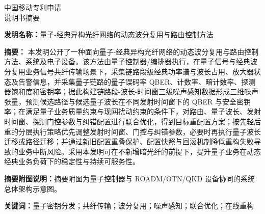 \documentclass[12pt,a4paper]{article}
\begin{document}
\begin{center}
    {\Large\heiti 中国移动专利申请} \\[0.5em]
    {\Huge\heiti 说明书摘要} \\[0.8em]
\end{center}

\noindent\textbf{发明名称：}量子-经典异构光纤网络的动态波分复用与路由控制方法

\vspace{0.8em}

\noindent\textbf{摘要：}
本发明公开了一种面向量子-经典异构光纤网络的动态波分复用与路由控制方法、系统及电子设备。该方法由量子控制器/编排器执行，在量子信号与经典波分复用业务信号共纤传输场景下，采集链路段级经典功率谱与波长占用、放大器状态及告警信息，并采集量子链路的量子误码率 QBER、计数率、暗计数率、探测器饱和度和密钥率；据此构建链路段-波长-时间窗三级噪声感知数据形成三维噪声张量，预测候选路径与候选量子波长在不同发射时间窗下的 QBER 与安全密钥率；在满足量子业务质量约束与现网扰动约束的条件下，对路由、量子波长、发射时间窗、探测门控参数与纠错配置进行联合优化，得到目标重配置方案；按先轻后重的分层执行策略优先调整发射时间窗、门控与纠错参数，必要时再执行量子波长迁移或路径迁移；并通过新旧配置重叠保护、配置快照与回滚机制降低重构失败导致的业务中断风险。采用本发明可在不新增暗光纤的前提下，提升量子业务在动态经典业务负荷下的稳定性与持续可服务性。

\vspace{0.6em}

\noindent\textbf{摘要附图说明：}摘要附图为量子控制器与 ROADM/OTN/QKD 设备协同的系统总体架构示意图。

\vspace{0.6em}

\noindent\textbf{关键词：}量子密钥分发；共纤传输；波分复用；噪声感知；联合优化；在线重构
\end{document}
